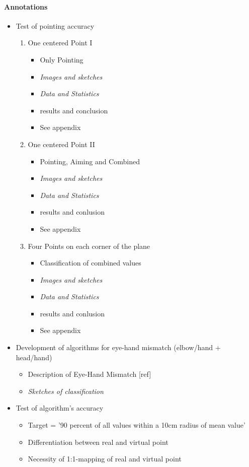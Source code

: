 \paragraph{Annotations}

\begin{itemize}
	\item Test of pointing accuracy
	\begin{enumerate}
		\item One centered Point I
		\begin{itemize}
			\item Only Pointing
			\item \textit{Images and sketches}
			\item \textit{Data and Statistics}
			\item results and conclusion
			\item See appendix
		\end{itemize}
		\item One centered Point II
		\begin{itemize}
			\item Pointing, Aiming and Combined
			\item \textit{Images and sketches}
			\item \textit{Data and Statistics}
			\item results and conlusion
			\item See appendix
		\end{itemize}
		\item Four Points on each corner of the plane
		\begin{itemize}
			\item Classification of combined values
			\item \textit{Images and sketches}
			\item \textit{Data and Statistics}
			\item results and conlusion
			\item See appendix
		\end{itemize}
	\end{enumerate}
	\item Development of algorithms for eye-hand mismatch (elbow/hand + head/hand)
	\begin{itemize}
		\item Description of Eye-Hand Mismatch [ref]
		\item \textit{Sketches of classification}
	\end{itemize}
	\item Test of algorithm's accuracy
	\begin{itemize}
		\item Target = '90 percent of all values within a 10cm radius of mean value'
		\item Differentiation between real and virtual point
		\item Necessity of 1:1-mapping of real and virtual point
	\end{itemize}
\end{itemize}

